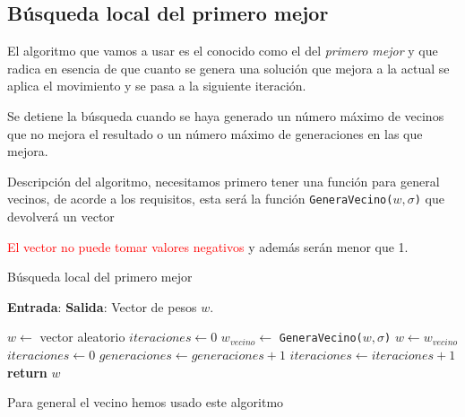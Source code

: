 \subsection{Búsqueda local del primero mejor}  

El algoritmo que vamos a usar es el conocido como el del \textit{primero mejor} y que radica en esencia de que  cuanto se genera 
una solución que mejora a la actual se aplica el movimiento y se pasa a la siguiente iteración.

Se detiene la búsqueda cuando se haya generado un número máximo de vecinos que no mejora el resultado
o un número máximo de generaciones en las que mejora.

Descripción del algoritmo, necesitamos primero tener una función para general vecinos, de acorde a los requisitos, esta será 
la función \texttt{GeneraVecino($w,\sigma$)} que devolverá un vector 

\textcolor{red}{El vector no puede tomar valores negativos} y además serán menor que 1.
\begin{algorithm}
    \caption{Búsqueda local del primero mejor}
    \hspace*{\algorithmicindent} 
        \textbf{Entrada}:
        \hspace*{\algorithmicindent} 
        \textbf{Salida}:
        Vector de pesos $w$.        
    \begin{algorithmic}[1]
          \State $w \gets$ vector aleatorio  
          \State $iteraciones \gets 0$ 
        \State $w_{vecino} \gets$ \texttt{GeneraVecino($w,\sigma$)}
          \State $w \gets w_{vecino}$
          \State $iteraciones \gets 0$ 
          \State $generaciones \gets generaciones +1$
        \EndIf
        \State $iteraciones \gets iteraciones +1$
        \EndWhile
        \State \textbf{return} $w$
      \EndProcedure
    \end{algorithmic}
  \end{algorithm}

  Para general el vecino hemos usado este algoritmo 

